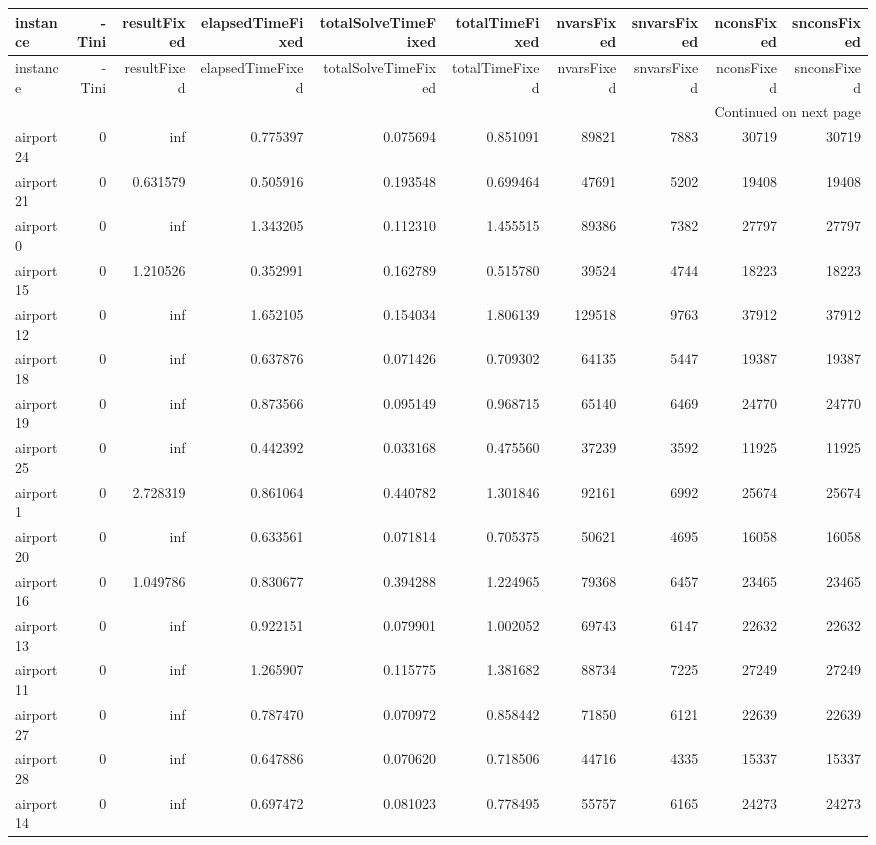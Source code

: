 
\begin{longtable}{|l|r|r|r|r|r|r|r|r|r|}
\toprule
instance & -Tini & resultFixed & elapsedTimeFixed & totalSolveTimeFixed & totalTimeFixed & nvarsFixed & snvarsFixed & nconsFixed & snconsFixed \\
\midrule
\endfirsthead
\toprule
instance & -Tini & resultFixed & elapsedTimeFixed & totalSolveTimeFixed & totalTimeFixed & nvarsFixed & snvarsFixed & nconsFixed & snconsFixed \\
\midrule
\endhead
\midrule
\multicolumn{10}{r}{Continued on next page} \\
\midrule
\endfoot
\bottomrule
\endlastfoot
airport24 & 0 & inf & 0.775397 & 0.075694 & 0.851091 & 89821 & 7883 & 30719 & 30719 \\
airport21 & 0 & 0.631579 & 0.505916 & 0.193548 & 0.699464 & 47691 & 5202 & 19408 & 19408 \\
airport0 & 0 & inf & 1.343205 & 0.112310 & 1.455515 & 89386 & 7382 & 27797 & 27797 \\
airport15 & 0 & 1.210526 & 0.352991 & 0.162789 & 0.515780 & 39524 & 4744 & 18223 & 18223 \\
airport12 & 0 & inf & 1.652105 & 0.154034 & 1.806139 & 129518 & 9763 & 37912 & 37912 \\
airport18 & 0 & inf & 0.637876 & 0.071426 & 0.709302 & 64135 & 5447 & 19387 & 19387 \\
airport19 & 0 & inf & 0.873566 & 0.095149 & 0.968715 & 65140 & 6469 & 24770 & 24770 \\
airport25 & 0 & inf & 0.442392 & 0.033168 & 0.475560 & 37239 & 3592 & 11925 & 11925 \\
airport1 & 0 & 2.728319 & 0.861064 & 0.440782 & 1.301846 & 92161 & 6992 & 25674 & 25674 \\
airport20 & 0 & inf & 0.633561 & 0.071814 & 0.705375 & 50621 & 4695 & 16058 & 16058 \\
airport16 & 0 & 1.049786 & 0.830677 & 0.394288 & 1.224965 & 79368 & 6457 & 23465 & 23465 \\
airport13 & 0 & inf & 0.922151 & 0.079901 & 1.002052 & 69743 & 6147 & 22632 & 22632 \\
airport11 & 0 & inf & 1.265907 & 0.115775 & 1.381682 & 88734 & 7225 & 27249 & 27249 \\
airport27 & 0 & inf & 0.787470 & 0.070972 & 0.858442 & 71850 & 6121 & 22639 & 22639 \\
airport28 & 0 & inf & 0.647886 & 0.070620 & 0.718506 & 44716 & 4335 & 15337 & 15337 \\
airport14 & 0 & inf & 0.697472 & 0.081023 & 0.778495 & 55757 & 6165 & 24273 & 24273 \\

\end{longtable}
